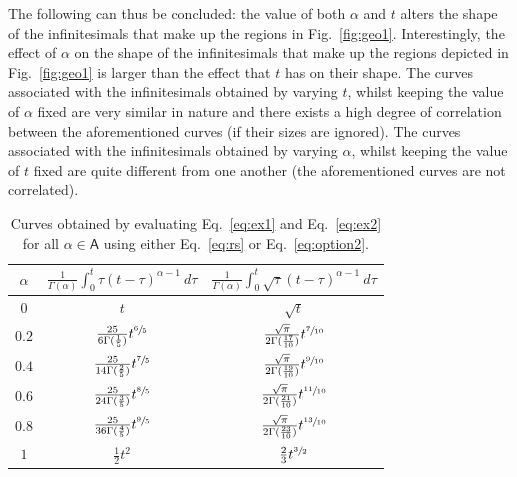 \documentclass[twoside,reqno,11pt]{fcaa-var} %
\begin{document}
The following can thus be concluded: the value of both $\alpha$ and $t$ alters the shape of the infinitesimals that make up the regions in Fig.~\ref{fig:geo1}. Interestingly, the effect of $\alpha$ on the shape of the infinitesimals that make up the regions depicted in Fig.~\ref{fig:geo1} is larger than the effect that $t$ has on their shape. The curves associated with the infinitesimals obtained by varying $t$, whilst keeping the value of $\alpha$ fixed are very similar in nature and there exists a high degree of correlation between the aforementioned curves (if their 
sizes are ignored). The curves associated with the infinitesimals obtained by varying $\alpha$, whilst keeping the value of $t$ fixed are quite different from one another (the aforementioned curves are not correlated).\\  


\begin{table}[h!]
\centering
\caption{Curves obtained by evaluating Eq.~\eqref{eq:ex1} and Eq.~\eqref{eq:ex2} for all $\alpha\in \mathsf{A}$ using either Eq.~\eqref{eq:rs} or Eq.~\eqref{eq:option2}.}
\label{tab:eval}
\begin{tabular}{||c|| c| c||} 
 \hline
 $\alpha$ & $\frac{1}{\Gamma(\alpha)}\int_0^t \tau(t-\tau)^{\alpha-1}~d\tau$ & $\frac{1}{\Gamma(\alpha)}\int_0^t \sqrt{\tau}(t-\tau)^{\alpha-1}~d\tau$ \\[0.5ex]
 \hline\hline
 \rule{0pt}{2.5ex}
 $0$ & $t$ & $\sqrt{t}$  \\  
 \rule{0pt}{2.5ex}
 $0.2$ & $\frac{25}{6\Gamma(\frac{1}{5})} t^{\sfrac{6}{5}}$  & $\frac{\sqrt{\pi}}{2\Gamma(\frac{17}{10})} t^{\sfrac{7}{10}}$  \\ 
 \rule{0pt}{2.5ex}
 $0.4$ & $\frac{25}{14\Gamma(\frac{2}{5})} t^{\sfrac{7}{5}}$  & $\frac{\sqrt{\pi}}{2\Gamma(\frac{19}{10})} t^{\sfrac{9}{10}}$  \\
 \rule{0pt}{2.5ex}
 $0.6$ & $\frac{25}{24\Gamma(\frac{3}{5})} t^{\sfrac{8}{5}}$  & $\frac{\sqrt{\pi}}{2\Gamma(\frac{21}{10})} t^{\sfrac{11}{10}}$  \\ 
 \rule{0pt}{2.5ex}
 $0.8$ & $\frac{25}{36\Gamma(\frac{4}{5})} t^{\sfrac{9}{5}}$  & $\frac{\sqrt{\pi}}{2\Gamma(\frac{23}{10})} t^{\sfrac{13}{10}}$  \\ 
 \rule{0pt}{2.5ex}
 $1$ & $\frac{1}{2}t^2$  & $\frac{2}{3}t^{\sfrac{3}{2}}$  \\ [1ex]
 \hline
 \end{tabular}
\end{table}
\end{document}
